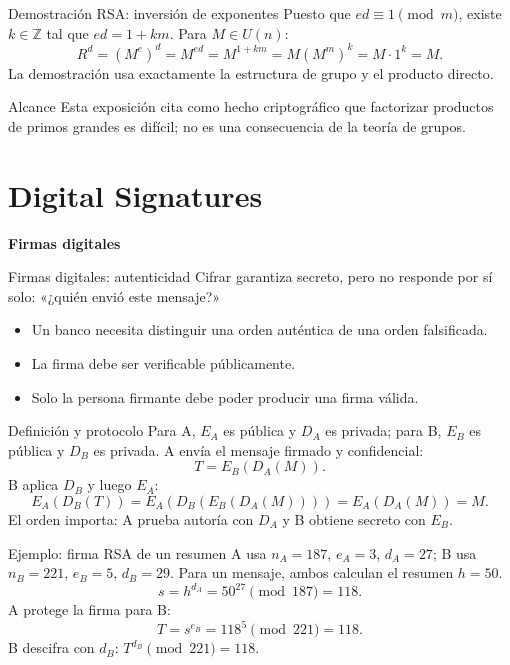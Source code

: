 \documentclass[aspectratio=169,11pt]{beamer}
\newcommand{\Z}{\mathbb Z}
\newcommand{\modn}[1]{\pmod{#1}}
\begin{document}
\begin{frame}{Demostración RSA: inversión de exponentes}
  Puesto que $ed\equiv1\modn{m}$, existe $k\in\Z$ tal que $ed=1+km$.
  Para $M\in U(n)$:
  \[
    R^d=(M^e)^d=M^{ed}=M^{1+km}=M(M^m)^k=M\cdot1^k=M.
  \]
  La demostración usa exactamente la estructura de grupo y el producto directo.
  \begin{alertblock}{Alcance}
    Esta exposición cita como hecho criptográfico que factorizar productos de primos grandes es difícil; no es una consecuencia de la teoría de grupos.
  \end{alertblock}
\end{frame}

\section{Digital Signatures}

\begin{frame}
  \centering
  \vfill
  {\LARGE\bfseries Firmas digitales}
  \vfill
\end{frame}

\begin{frame}{Firmas digitales: autenticidad}
  Cifrar garantiza secreto, pero no responde por sí solo: «¿quién envió este mensaje?»
  \begin{itemize}
    \item Un banco necesita distinguir una orden auténtica de una orden falsificada.
    \item La firma debe ser verificable públicamente.
    \item Solo la persona firmante debe poder producir una firma válida.
  \end{itemize}
\end{frame}

\begin{frame}{Definición y protocolo}
  Para A, $E_A$ es pública y $D_A$ es privada; para B, $E_B$ es pública y $D_B$ es privada.
  A envía el mensaje firmado y confidencial:
  \[
    T=E_B(D_A(M)).
  \]
  B aplica $D_B$ y luego $E_A$:
  \[
    E_A(D_B(T))=E_A(D_B(E_B(D_A(M))))=E_A(D_A(M))=M.
  \]
  El orden importa: A prueba autoría con $D_A$ y B obtiene secreto con $E_B$.
\end{frame}

\begin{frame}{Ejemplo: firma RSA de un resumen}
  A usa $n_A=187$, $e_A=3$, $d_A=27$; B usa $n_B=221$, $e_B=5$, $d_B=29$.
  Para un mensaje, ambos calculan el resumen $h=50$.
  \[
    s=h^{d_A}=50^{27}\modn{187}=118.
  \]
  A protege la firma para B:
  \[
    T=s^{e_B}=118^5\modn{221}=118.
  \]
  B descifra con $d_B$: $T^{d_B}\modn{221}=118$.
\end{frame}
\end{document}
